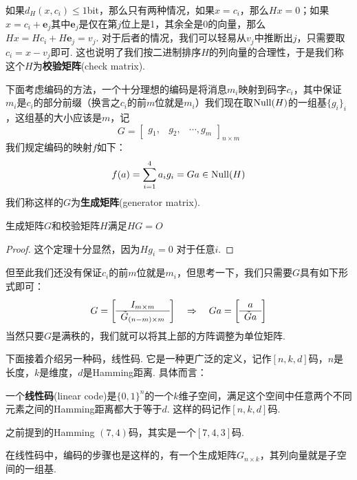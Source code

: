 如果$d_H(x, c_i) \le 1$bit，那么只有两种情况，如果$x=c_i$，那么$Hx=0$；如果$x = c_i + \bm{e}_j$其中$\bm{e}_j$是仅在第$j$位上是1，其余全是0的向量，那么$Hx = Hc_i + H\bm{e}_j = v_j$. 对于后者的情况，我们可以轻易从$v_j$中推断出$j$，只需要取$c_i = x - v_j$即可. 这也说明了我们按二进制排序$H$的列向量的合理性，于是我们称这个$H$为\textbf{校验矩阵}(check matrix). 

下面考虑编码的方法，一个十分理想的编码是将消息$m_i$映射到码字$c_i$，其中保证$m_i$是$c_i$的部分前缀（换言之$c_i$的前$m$位就是$m_i$）我们现在取$\operatorname*{Null}(H)$的一组基$\{g_i\}_i$，这组基的大小应该是$m$，记 
\[
G = \begin{bmatrix}
    g_1, & g_2, & \cdots ,g_{m}
\end{bmatrix}_{n \times m}
\]
我们规定编码的映射$f$如下：
\[
f(a) = \sum_{i=1}^4 a_i g_i = Ga \in \operatorname*{Null}(H)
\]
我们称这样的$G$为\textbf{生成矩阵}(generator matrix). 

\begin{theorem}
    生成矩阵$G$和校验矩阵$H$满足$HG=O$
\end{theorem}
\begin{proof}
    这个定理十分显然，因为$Hg_i= 0$ 对于任意$i$.
\end{proof}

但至此我们还没有保证$c_i$的前$m$位就是$m_i$，但思考一下，我们只需要$G$具有如下形式即可：
\[
G = \left[\begin{array}{c}
I_{m \times m} \\ \hline 
\tilde{G}_{(n-m)\times m}
\end{array}\right] \quad \Rightarrow \quad 
Ga = \left[\begin{array}{c}
a \\ \hline 
\tilde{G}a
\end{array}\right]
\]
当然只要$G$是满秩的，我们就可以将其上部的方阵调整为单位矩阵. 

下面接着介绍另一种码，线性码. 它是一种更广泛的定义，记作$[n,k,d]$码，$n$是长度，$k$是维度，$d$是Hamming距离. 具体而言：
\begin{definition}[线性码]
    一个\textbf{线性码}(linear code)是$\{0,1\}^n$的一个$k$维子空间，满足这个空间中任意两个不同元素之间的Hamming距离都大于等于$d$.  这样的码记作$[n,k,d]$码. 
\end{definition}
\begin{example}
    之前提到的Hamming $(7,4)$码，其实是一个$[7,4,3]$码.
\end{example} 

在线性码中，编码的步骤也是这样的，有一个生成矩阵$G_{n\times k}$，其列向量就是子空间的一组基. 

